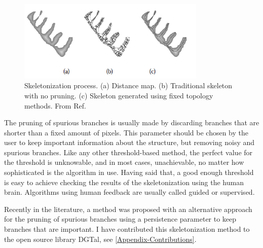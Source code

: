 \begin{figure}[ht]
\centering
\includegraphics[width=0.8\textwidth]{Figures/chapter-network/skeleton-fixedtopo_letters.png}%
\caption[Skeletonization]{Skeletonization process. (a) Distance
map. (b) Traditional skeleton with no pruning. (c) Skeleton generated using
fixed topology methods. From Ref.\citep{bai_skeleton_2007,golland_fixed_2000}}
\label{fig:skeleton-fixedtopo-network}
\end{figure}

The pruning of spurious branches is usually made by discarding branches that are shorter than a fixed amount of pixels. This parameter should be chosen by the user to keep important information about the structure, but removing noisy and spurious branches. Like any other threshold-based method, the perfect value for the threshold is unknowable, and in most cases, unachievable, no matter how sophisticated is the algorithm in use. Having said that, a good enough threshold is easy to achieve checking the results of the skeletonization using the human brain. Algorithms using human feedback are usually called guided or supervised.

Recently in the literature, a method was proposed with an alternative approach for the pruning of spurious branches \cite{couprie_3d_2015, bertrand_parallel_2017} using a persistence parameter to keep branches that are important. I have contributed this skeletonization method to the open source library DGTal, see \autoref{Appendix-Contributions}.

